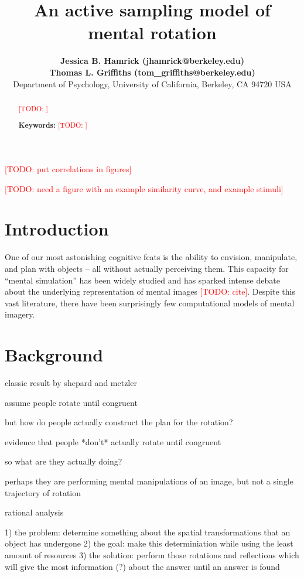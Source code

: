\documentclass[10pt,letterpaper]{article}
\title{An active sampling model of mental rotation}
\author{{\large \bf Jessica B. Hamrick (jhamrick@berkeley.edu)} \\
  {\large \bf Thomas L. Griffiths (tom\_griffiths@berkeley.edu)} \\
  Department of Psychology, University of California, Berkeley, CA
  94720 USA}
\newcommand{\TODO}[1]{\textcolor{red}{[TODO: #1]}}
\begin{document}
\maketitle


\begin{abstract}
\TODO{}

\textbf{Keywords:} 
\TODO{}
\end{abstract}

\TODO{put correlations in figures} 

\TODO{need a figure with an example similarity curve, and example
  stimuli}

\section{Introduction}

One of our most astonishing cognitive feats is the ability to
envision, manipulate, and plan with objects -- all without actually
perceiving them. This capacity for ``mental simulation'' has been
widely studied and has sparked intense debate about the underlying
representation of mental images \TODO{cite}. Despite this vast
literature, there have been surprisingly few computational models of
mental imagery.



\section{Background}

classic result by shepard and metzler

assume people rotate until congruent

but how do people actually construct the plan for the rotation?

evidence that people *don't* actually rotate until congruent

so what are they actually doing?

perhaps they are performing mental manipulations of an image, but not
a single trajectory of rotation

rational analysis \cite{Marr:1983to,anderson90,Shepard:1987tt}

1) the problem: determine something about the spatial transformations
that an object has undergone
2) the goal: make this determiniation while using the least amount of
resources
3) the solution: perform those rotations and reflections which will
give the most information (?) about the answer until an answer is
found
\end{document}
